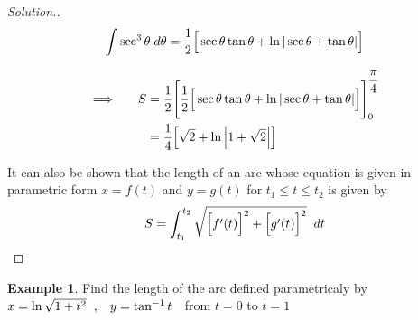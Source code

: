 \documentclass[11pt,a4paper]{article}
\theoremstyle{definition}
\newtheorem{exa}[thm]{Example}
\newenvironment{solution}
  {\renewcommand{\qedsymbol}{}\begin{proof}[\textit{Solution}.]}
  {\end{proof}}
\begin{document}
\begin{solution}
$$\int \sec^3\theta \hspace{0.1cm}d\theta = \dfrac{1}{2}\Big[\sec \theta \tan \theta + \ln |\sec \theta + \tan \theta | \Big]$$

\begin{align*}
\implies\hspace{0.5cm} S & = \dfrac{1}{2}\Bigg[\dfrac{1}{2}\Big[\sec \theta \tan \theta + \ln |\sec \theta + \tan \theta |\Big] \Bigg]^{\dfrac{\pi}{4}}_0\\
& = \dfrac{1}{4}\Big[\sqrt{2} + \ln \Big|1 + \sqrt{2}\Big|\Big]\\
\end{align*}

It can also be shown that the length of an arc whose equation is given in parametric form $x = f(t)$ and $y = g(t)$ for $t_1 \leq t \leq t_2$ is given by $$S = \int^{t_2}_{t_1} \sqrt{\Big[f'(t)\Big]^2 + \Big[g'(t)\Big]^2}\hspace{0.2cm} dt$$
\end{solution}


\begin{exa}


Find the length of the arc defined parametricaly by $x = \ln \sqrt{1 + t^2}\hspace{0.2cm}, \hspace{0.3cm} y = \tan^{-1}t\hspace{0.2cm}$ from $t = 0$ to $t = 1$
\end{exa}
\end{document}

